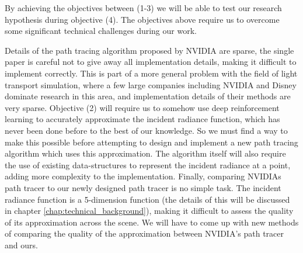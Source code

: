 \documentclass[../dissertation.tex]{subfiles}
\begin{document}
By achieving the objectives between (1-3) we will be able to test our research hypothesis during objective (4). The objectives above require us to overcome some significant technical challenges during our work.

Details of the path tracing algorithm proposed by NVIDIA are sparse, the single paper \cite{dahm2017learning} is careful not to give away all implementation details, making it difficult to implement correctly. This is part of a more general problem with the field of light transport simulation, where a few large companies including NVIDIA and Disney dominate research in this area, and implementation details of their methods are very sparse. Objective (2) will require us to somehow use deep reinforcement learning to accurately approximate the incident radiance function, which has never been done before to the best of our knowledge. So we must find a way to make this possible before attempting to design and implement a new path tracing algorithm which uses this approximation. The algorithm itself will also require the use of existing data-structures to represent the incident radiance at a point, adding more complexity to the implementation. Finally, comparing NVIDIAs path tracer to our newly designed path tracer is no simple task. The incident radiance function is a 5-dimension function (the details of this will be discussed in chapter \ref{chap:technical_background}), making it difficult to assess the quality of its approximation across the scene. We will have to come up  with new methods of comparing the quality of the approximation between NVIDIA's path tracer and ours.
\end{document}
